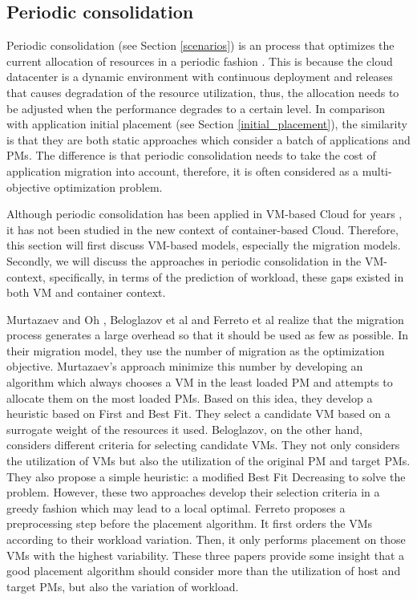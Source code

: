 \subsection{Periodic consolidation}
Periodic consolidation (see Section \ref{scenarios}) is an process that optimizes the current allocation of resources in a periodic fashion \cite{Mishra:2012kx}. This is because the cloud datacenter is a dynamic environment with continuous deployment and releases that causes degradation of the resource utilization, thus, the allocation needs to be adjusted when the performance degrades to a certain level. In comparison with application initial placement (see Section \ref{initial_placement}), the similarity is that they are both static approaches which consider a batch of applications and PMs. The difference is that periodic consolidation needs to take the cost of application migration into account, therefore, it is often considered as a multi-objective optimization problem. 

Although periodic consolidation has been applied in VM-based Cloud for years \cite{Murtazaev:2014eo,Ferreto:2011ii}, it has not been studied in the new context of container-based Cloud. Therefore, this section will first discuss VM-based models, especially the migration models. Secondly, we will discuss the approaches in periodic consolidation in the VM-context, specifically, in terms of the prediction of workload, these gaps existed in both VM and container context. 


Murtazaev and Oh \cite{Murtazaev:2014eo}, Beloglazov et al \cite{Beloglazov:2012ji} and Ferreto et al \cite{Ferreto:2011ii} realize that the migration process generates a large overhead so that it should be used as few as possible. In their migration model, they use the number of migration as the optimization objective. Murtazaev's approach minimize this number by developing an algorithm which always chooses a VM in the least loaded PM and attempts to allocate them on the most loaded PMs. Based on this idea, they develop a heuristic based on First and Best Fit. They select a candidate VM based on a surrogate weight of the resources it used.
Beloglazov, on the other hand, considers different criteria for selecting candidate VMs. They not only considers the utilization of VMs but also the utilization of the original PM and target PMs. They also propose a simple heuristic: a modified Best Fit Decreasing to solve the problem. However, these two approaches develop their selection criteria in a greedy fashion which may lead to a local optimal. 
Ferreto proposes a preprocessing step before the placement algorithm. It first orders the VMs according to their workload variation. Then, it only performs placement on those VMs with  the highest variability. These three papers provide some insight that a good placement algorithm should consider more than the utilization of host and target PMs, but also the variation of workload. 

